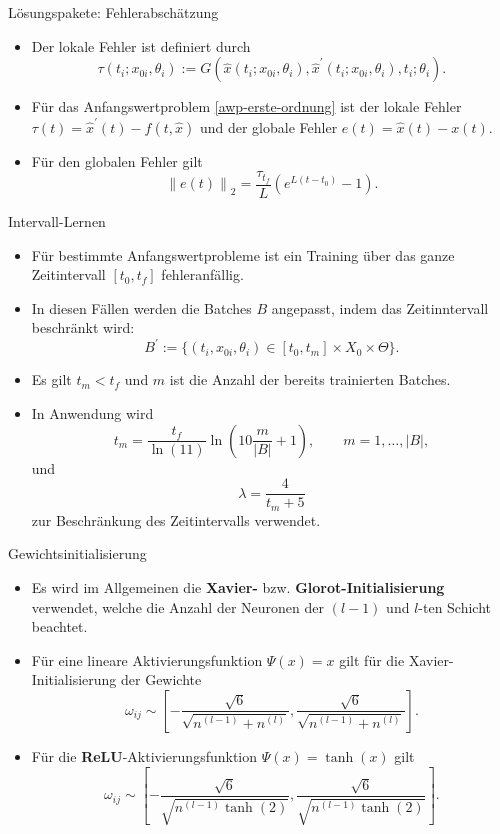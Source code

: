 \begin{frame}{Lösungspakete: Fehlerabschätzung}
    \begin{itemize}
        \item<1-> Der lokale Fehler ist definiert durch
        \[
            \tau(t_i;x_{0i}, \theta_i)
            := G \left( \hat{x}(t_i;x_{0i}, \theta_i), \hat{x}^{\prime}(t_i;x_{0i}, \theta_i),t_i;\theta_i \right).
        \]
        \item<2-> Für das Anfangswertproblem \eqref{awp-erste-ordnung} ist der lokale Fehler
        $\tau(t) = \hat{x}^{\prime}(t) - f(t,\hat{x})$ und der globale Fehler $e(t) = \hat{x}(t) - x(t)$.
        \item<3-> Für den globalen Fehler gilt
        \[
            \left\lVert e(t) \right\rVert_2 = \frac{\tau_{t_f}}{L} \left( e^{L(t-t_0)} - 1 \right).
        \]
    \end{itemize}
\end{frame}

\begin{frame}{Intervall-Lernen}
    \begin{itemize}
        \item<1-> Für bestimmte Anfangswertprobleme ist ein Training über das ganze Zeitintervall $[t_0,t_f]$ fehleranfällig.
        \item<2-> In diesen Fällen werden die Batches $B$ angepasst, indem das Zeitinntervall beschränkt wird:
        \[
            B^{\prime}:=  \{(t_i,x_{0i},\theta_i) \in [t_0,t_m] \times X_0 \times \Theta\}.
        \]
        \item<3-> Es gilt $t_m<t_f$ und $m$ ist die Anzahl der bereits trainierten Batches.
        \item<4-> In Anwendung wird
        \[
            t_m = \frac{t_f}{\ln(11)} \ln\left(10 \frac{m}{|B|} + 1 \right), \qquad m = 1, \dots, |B|,
        \]
        und
        \[
            \lambda = \frac{4}{t_m + 5}
        \]
        zur Beschränkung des Zeitintervalls verwendet.
    \end{itemize}
\end{frame}

\begin{frame}{Gewichtsinitialisierung}
    \begin{itemize}
        \item<1-> Es wird im Allgemeinen die \textbf{Xavier- } bzw. \textbf{Glorot-Initialisierung} verwendet, welche die
        Anzahl der Neuronen der $(l-1)$ und $l$-ten Schicht beachtet.
        \item<2-> Für eine lineare Aktivierungsfunktion $\Psi(x)=x$ gilt für die Xavier-Initialisierung der Gewichte
        \[
            \omega_{ij} \sim
            \left[ -\frac{\sqrt {6}}{\sqrt {n^{(l-1)} + n^{(l)}}}, \frac{\sqrt {6}}{\sqrt {n^{(l-1)} + n^{(l)}}} \right].
        \]
        \item<2-> Für die \textbf{ReLU}-Aktivierungsfunktion $\Psi(x)=\tanh(x)$ gilt
        \[
            \omega_{ij} \sim
            \left[ -\frac{\sqrt {6}}{\sqrt {n^{(l-1)} \tanh(2)}}, \frac{\sqrt {6}}{\sqrt {n^{(l-1)} \tanh(2)}} \right].
        \]
    \end{itemize}
\end{frame}

